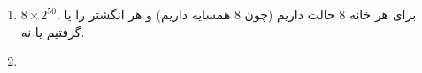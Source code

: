 \begin{enumerate}
    \item $8 \times 2^{50}$. برای هر خانه 8 حالت داریم (چون 8 همسایه داریم) و هر انگشتر را یا گرفتیم یا نه.
    \item 
\end{enumerate}